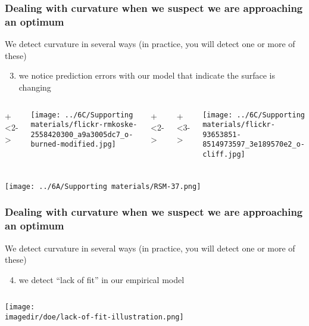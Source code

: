 \begin{frame}\frametitle{Dealing with curvature when we suspect we are approaching an optimum}
	{\color{myOrange}We detect curvature in several ways (in practice, you will detect one or more of these)}
	
	\vspace{.7cm}
	\begin{enumerate}\setcounter{enumi}{2}
		\item	we notice prediction errors with our model that indicate the surface is changing
	\end{enumerate}
	
	
	\vspace{.5cm}
	\begin{columns}[T]
			
			\onslide+<2->{
			
				\centerline{\texttt{[image: ../6C/Supporting materials/flickr-rmkoske-2558420300\_a9a3005dc7\_o-burned-modified.jpg]}}
			}
			
		
			\onslide+<2->{
			
				\vspace{.5cm}
				
			
			}
			\onslide+<3->{
				
				\centerline{\texttt{[image: ../6C/Supporting materials/flickr-93653851-8514973597\_3e189570e2\_o-cliff.jpg]}}
				\vspace{-1.2cm}
			}
	\end{columns}
	
\end{frame}

\begin{frame}\frametitle{}
	\centerline{\texttt{[image: ../6A/Supporting materials/RSM-37.png]}}
\end{frame}

\begin{frame}\frametitle{Dealing with curvature when we suspect we are approaching an optimum}
	{\color{myOrange}We detect curvature in several ways (in practice, you will detect one or more of these)}
	
	\vspace{.7cm}
	\begin{enumerate}\setcounter{enumi}{3}
		\item	we detect ``lack of fit'' in our empirical model
	\end{enumerate}
	
	\begin{columns}[T]

			
			\centerline{\texttt{[image: \\imagedir/doe/lack-of-fit-illustration.png]}}
	\end{columns}
	
\end{frame}

